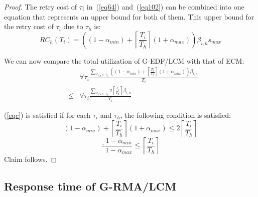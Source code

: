 \documentclass[conference]{IEEEtran}
\begin{document}
\begin{proof}
The retry cost 
of $\tau_i$ in~(\ref{eq64}) and~(\ref{eq102}) can be combined into one equation that represents an upper bound for both of them.
 This upper bound for the retry cost 
of $\tau_i$ due to $\tau_h$ is:
\begin{equation}
RC_h(T_i)=\left((1-\alpha_{min})+\left\lceil\frac{T_{i}}{T_{h}}\right\rceil(1+\alpha_{max})\right)\beta_{i,h}s_{max}
\label{newcost}\end{equation}

We can now compare the total utilization of G-EDF/LCM with that of ECM:
\begin{eqnarray}
& & \forall \tau_{i}\frac{\sum_{\forall \tau_{h}\in\gamma_{i}}\left((1-\alpha_{min})+\left\lceil\frac{T_{i}}{T_{h}}\right\rceil(1+\alpha_{max})\right)\beta_{i,h}}{T_{i}} \nonumber\\
& \le &   \forall \tau_{i}\frac{\sum_{\forall \tau_{h}\in\gamma_{i}}2\left\lceil\frac{T_{i}}{T_{h}}\right\rceil\beta_{i,h}}{T_{i}}\label{eqc}\end{eqnarray}

(\ref{eqc}) is satisfied if for each $\tau_{i}$ and $\tau_{h}$, 
the following condition is satisfied:
\begin{equation*}
(1-\alpha_{min})+\left\lceil\frac{T_{i}}{T_{h}}\right\rceil(1+\alpha_{max})  \le  2\left\lceil\frac{T_{i}}{T_{h}}\right\rceil
\end{equation*}
\begin{equation*}
\therefore\frac{1-\alpha_{min}}{1-\alpha_{max}}  \le  \left\lceil\frac{T_{i}}{T_{h}}\right\rceil
\end{equation*}
Claim follows.
\end{proof}

\subsection{Response time of G-RMA/LCM}
\label{rma}
\end{document}
